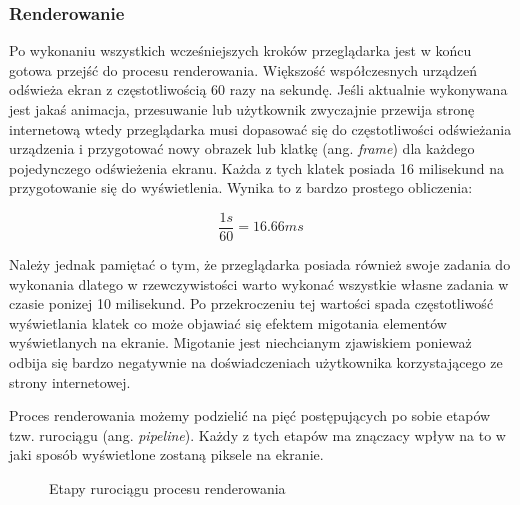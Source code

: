\documentclass[polish, twoside, 12pt]{mwart}
\begin{document}
\subsubsection{Renderowanie}

Po wykonaniu wszystkich wcześniejszych kroków przeglądarka jest w końcu gotowa przejść do procesu renderowania. Większość współczesnych urządzeń odświeża ekran z częstotliwością 60 razy na sekundę. Jeśli aktualnie wykonywana jest jakaś animacja, przesuwanie lub użytkownik zwyczajnie przewija stronę internetową wtedy przeglądarka musi dopasować się do częstotliwości odświeżania urządzenia i przygotować nowy obrazek lub klatkę (ang. \emph{frame}) dla każdego pojedynczego odświeżenia ekranu. Każda z tych klatek posiada 16 milisekund na przygotowanie się do wyświetlenia. Wynika to z bardzo prostego obliczenia:

\begin{equation}
  \frac{1s}{60} = 16.66 ms
\end{equation}

Należy jednak pamiętać o tym, że przeglądarka posiada również swoje zadania do wykonania dlatego w rzewczywistości warto wykonać wszystkie własne zadania w czasie ponizej 10 milisekund. Po przekroczeniu tej wartości spada częstotliwość wyświetlania klatek co może objawiać się efektem migotania elementów wyświetlanych na ekranie. Migotanie jest niechcianym zjawiskiem ponieważ odbija się bardzo negatywnie na doświadczeniach użytkownika korzystającego ze strony internetowej.

Proces renderowania możemy podzielić na pięć postępujących po sobie etapów tzw. rurociągu (ang. \emph{pipeline}). Każdy z tych etapów ma znączacy wpływ na to w jaki sposób wyświetlone zostaną piksele na ekranie.

\begin{figure}[ht]
	\caption{Etapy rurociągu procesu renderowania}
\end{figure}
\end{document}
